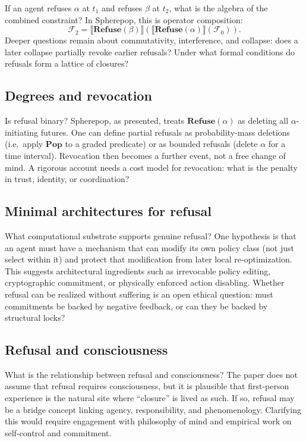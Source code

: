 \documentclass[11pt]{article}
\newcommand{\Future}{\mathcal{F}}
\begin{document}
If an agent refuses $\alpha$ at $t_1$ and refuses $\beta$ at $t_2$, what is the
algebra of the combined constraint? In Spherepop, this is operator composition:
\[
\Future_2 = \llbracket \mathbf{Refuse}(\beta)\rrbracket(
\llbracket \mathbf{Refuse}(\alpha)\rrbracket(\Future_0)).
\]
Deeper questions remain about commutativity, interference, and collapse: does a
later collapse partially revoke earlier refusals? Under what formal conditions do
refusals form a lattice of closures?

\subsection{Degrees and revocation}

Is refusal binary? Spherepop, as presented, treats $\mathbf{Refuse}(\alpha)$
as deleting all $\alpha$-initiating futures. One can define partial refusals as
probability-mass deletions (i.e.\ apply $\mathbf{Pop}$ to a graded predicate)
or as bounded refusals (delete $\alpha$ for a time interval). Revocation then
becomes a further event, not a free change of mind. A rigorous account needs a
cost model for revocation: what is the penalty in trust, identity, or
coordination?

\subsection{Minimal architectures for refusal}

What computational substrate supports genuine refusal? One hypothesis is that an
agent must have a mechanism that can modify its own policy class (not just select
within it) and protect that modification from later local re-optimization. This
suggests architectural ingredients such as irrevocable policy editing,
cryptographic commitment, or physically enforced action disabling. Whether
refusal can be realized without suffering is an open ethical question: must
commitments be backed by negative feedback, or can they be backed by structural
locks?

\subsection{Refusal and consciousness}

What is the relationship between refusal and consciousness? The paper does not
assume that refusal requires consciousness, but it is plausible that first-person
experience is the natural site where ``closure'' is lived as such. If so,
refusal may be a bridge concept linking agency, responsibility, and
phenomenology. Clarifying this would require engagement with philosophy of mind
and empirical work on self-control and commitment.
\end{document}
